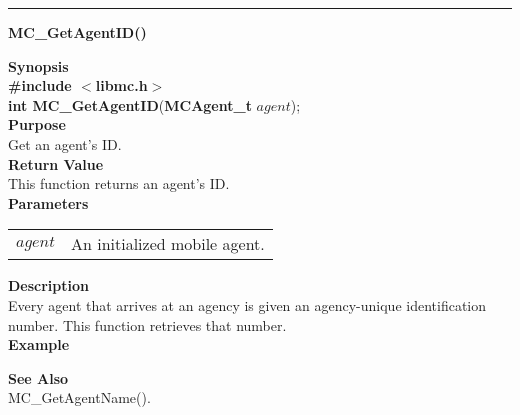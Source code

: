 \noindent
\vspace{5pt}
\rule{6.5in}{0.015in}
\noindent
{}
{\LARGE \bf MC\_GetAgentID()}\\
\label{api:MC_GetAgentID()}

\noindent
{\bf Synopsis}\\
{\bf \#include $<$libmc.h$>$}\\
{\bf int MC\_GetAgentID}({\bf MCAgent\_t} $agent$);\\

\noindent
{\bf Purpose}\\
Get an agent's ID. \\

\noindent
{\bf Return Value}\\
This function returns an agent's ID. \\

\noindent
{\bf Parameters}
\vspace{-0.1in}
\begin{description}
\item
\begin{tabular}{p{10 mm}p{145 mm}} 
$agent$ & An initialized mobile agent.
\end{tabular}
\end{description}

\noindent
{\bf Description}\\
Every agent that arrives at an agency is given an agency-unique 
identification number. This function retrieves that number.  \\

\noindent
{\bf Example}\\
\noindent
{\footnotesize}

\noindent
{\bf See Also}\\
MC\_GetAgentName().


